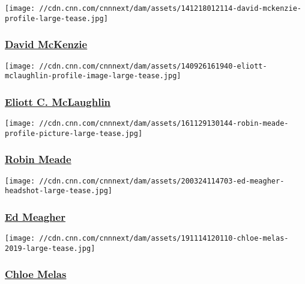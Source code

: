 \href{/profiles/david-mckenzie}{}

\texttt{[image: //cdn.cnn.com/cnnnext/dam/assets/141218012114-david-mckenzie-profile-large-tease.jpg]}

\hypertarget{david-mckenzie}{%
\subsubsection{\texorpdfstring{\href{/profiles/david-mckenzie}{David
McKenzie}}{David McKenzie}}\label{david-mckenzie}}

\href{/profiles/eliott-c-mclaughlin-profile}{}

\texttt{[image: //cdn.cnn.com/cnnnext/dam/assets/140926161940-eliott-mclaughlin-profile-image-large-tease.jpg]}

\hypertarget{eliott-c-mclaughlin}{%
\subsubsection{\texorpdfstring{\href{/profiles/eliott-c-mclaughlin-profile}{Eliott
C. McLaughlin}}{Eliott C. McLaughlin}}\label{eliott-c-mclaughlin}}

\href{/profiles/robin-meade}{}

\texttt{[image: //cdn.cnn.com/cnnnext/dam/assets/161129130144-robin-meade-profile-picture-large-tease.jpg]}

\hypertarget{robin-meade}{%
\subsubsection{\texorpdfstring{\href{/profiles/robin-meade}{Robin
Meade}}{Robin Meade}}\label{robin-meade}}

\href{/profiles/ed-meagher-profile}{}

\texttt{[image: //cdn.cnn.com/cnnnext/dam/assets/200324114703-ed-meagher-headshot-large-tease.jpg]}

\hypertarget{ed-meagher}{%
\subsubsection{\texorpdfstring{\href{/profiles/ed-meagher-profile}{Ed
Meagher}}{Ed Meagher}}\label{ed-meagher}}

\href{/profiles/chloe-melas}{}

\texttt{[image: //cdn.cnn.com/cnnnext/dam/assets/191114120110-chloe-melas-2019-large-tease.jpg]}

\hypertarget{chloe-melas}{%
\subsubsection{\texorpdfstring{\href{/profiles/chloe-melas}{Chloe
Melas}}{Chloe Melas}}\label{chloe-melas}}

